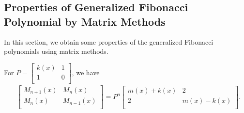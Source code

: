 \subsection{Properties of Generalized Fibonacci Polynomial by Matrix Methods}
In this section, we obtain some  properties of  the generalized Fibonacci polynomials using matrix methods.
\begin{theorem}For $P={
          \begin{bmatrix}
            k(x) & 1 \\
            1& 0 \\
          \end{bmatrix}
        }$, we have
\begin{align*}
&{
 \begin{bmatrix}
    M_{n+1}(x) & M_{n}(x) \\
    M_{n}(x) & M_{n-1}(x) \\
  \end{bmatrix}
}=P^n{
          \begin{bmatrix}
            m(x)+k(x) & 2 \\
            2 & m(x)-k(x) \\
          \end{bmatrix}
        }.
\end{align*}
\end{theorem}
